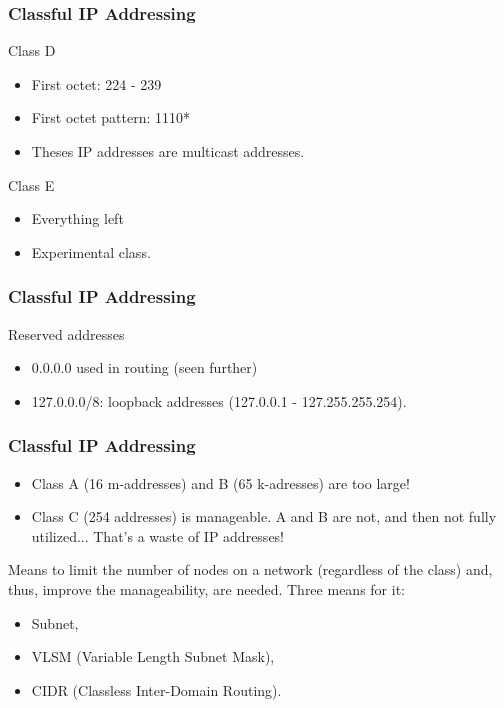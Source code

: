   \begin{frame}
    \frametitle{Classful IP Addressing}
    \begin{block}{Class D}
      \begin{itemize}
	\item First octet: {\color{ForestGreen}224} - {\color{ForestGreen}239}
	\item First octet pattern: {\color{ForestGreen}1110*}
	\item Theses IP addresses are multicast addresses.
      \end{itemize}
    \end{block}
    \begin{block}{Class E}
      \begin{itemize}
	\item Everything left
	\item Experimental class.
      \end{itemize}
    \end{block}
  \end{frame}

  \begin{frame}
    \frametitle{Classful IP Addressing}
    \begin{block}{Reserved addresses}
      \begin{itemize}
	\item 0.0.0.0 used in routing (seen further)
	\item {\color{ForestGreen}127}.{\color{blue}0.0.0}{\color{brown}/8}: loopback addresses ({\color{ForestGreen}127}.{\color{blue}0.0.1} - {\color{ForestGreen}127}.{\color{blue}255.255.254}).
      \end{itemize}
    \end{block}
  \end{frame}

  \begin{frame}
    \frametitle{Classful IP Addressing}
    \begin{itemize}
      \item Class A (16 m-addresses) and B (65 k-adresses) are too large!
      \item Class C (254 addresses) is manageable. A and B are not, and then not fully utilized... That's a waste of IP addresses!
    \end{itemize}
    Means to limit the number of nodes on a network (regardless of the class) and, thus, improve the manageability, are needed. Three means for it:
    \begin{itemize}
      \item Subnet,
      \item VLSM (Variable Length Subnet Mask),
      \item CIDR (Classless Inter-Domain Routing).
    \end{itemize}
  \end{frame}




